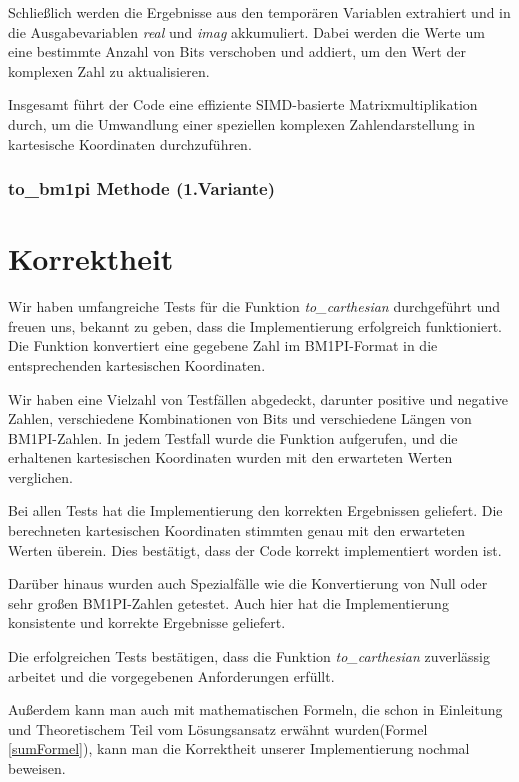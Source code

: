 \documentclass[course=erap]{aspdoc}
\begin{document}
Schließlich werden die Ergebnisse aus den temporären Variablen extrahiert und in die Ausgabevariablen \textit{real} und \textit{imag} akkumuliert. Dabei werden die Werte um eine bestimmte Anzahl von Bits verschoben und addiert, um den Wert der komplexen Zahl zu aktualisieren.

Insgesamt führt der Code eine effiziente SIMD-basierte Matrixmultiplikation durch, um die Umwandlung einer speziellen komplexen Zahlendarstellung in kartesische Koordinaten durchzuführen.

\subsubsection{to\_bm1pi Methode (1.Variante)}

\section{Korrektheit}
Wir haben umfangreiche Tests für die Funktion \textit{to\_carthesian} durchgeführt und freuen uns, bekannt zu geben, dass die Implementierung erfolgreich funktioniert. Die Funktion konvertiert eine gegebene Zahl im BM1PI-Format in die entsprechenden kartesischen Koordinaten.

Wir haben eine Vielzahl von Testfällen abgedeckt, darunter positive und negative Zahlen, verschiedene Kombinationen von Bits und verschiedene Längen von BM1PI-Zahlen. In jedem Testfall wurde die Funktion aufgerufen, und die erhaltenen kartesischen Koordinaten wurden mit den erwarteten Werten verglichen.

Bei allen Tests hat die Implementierung den korrekten Ergebnissen geliefert. Die berechneten kartesischen Koordinaten stimmten genau mit den erwarteten Werten überein. Dies bestätigt, dass der Code korrekt implementiert worden ist.

Darüber hinaus wurden auch Spezialfälle wie die Konvertierung von Null oder sehr großen BM1PI-Zahlen getestet. Auch hier hat die Implementierung konsistente und korrekte Ergebnisse geliefert.

Die erfolgreichen Tests bestätigen, dass die Funktion \textit{to\_carthesian} zuverlässig arbeitet und die vorgegebenen Anforderungen erfüllt.

Außerdem kann man auch mit mathematischen Formeln, die schon in Einleitung und Theoretischem Teil vom Lösungsansatz erwähnt wurden(Formel \ref{sumFormel}), kann man die Korrektheit unserer Implementierung nochmal beweisen.
\end{document}
